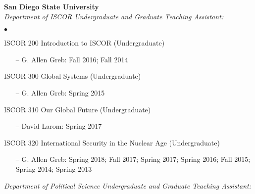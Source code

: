 \documentclass[letterpaper,12pt]{article}
\newenvironment{list2}{
  \begin{list}{$\bullet$}{%
      \setlength{\itemsep}{0in}
      \setlength{\parsep}{0in} 
      \setlength{\parskip}{0in}
      \setlength{\topsep}{0in} 
      \setlength{\partopsep}{0in}
      \setlength{\leftmargin}{1in}
      \setlength{\labelsep}{1em}
      \setlength{\labelwidth}{1em}
      \setlength{\itemindent}{-2em}
      \setlength{\listparindent}{2em}}}{\end{list}}
\begin{document}
\par
\textbf{San Diego State University}\\
\textit{Department of ISCOR Undergraduate and Graduate Teaching Assistant:}
\begin{list2}
    \item ISCOR 200 Introduction to ISCOR (Undergraduate)
        \begin{enumerate}[leftmargin=!,labelindent=0pt,itemindent=-15pt]
            \item[--] G. Allen Greb: Fall 2016; Fall 2014
        \end{enumerate}
    \item ISCOR 300 Global Systems (Undergraduate)
        \begin{enumerate}[leftmargin=!,labelindent=0pt,itemindent=-15pt]
            \item[--] G. Allen Greb: Spring 2015
        \end{enumerate}
    \item ISCOR 310 Our Global Future (Undergraduate)
        \begin{enumerate}[leftmargin=!,labelindent=0pt,itemindent=-15pt]
            \item[--] David Larom: Spring 2017
        \end{enumerate}
    \item ISCOR 320 International Security in the Nuclear Age (Undergraduate)
        \begin{enumerate}[leftmargin=!,labelindent=0pt,itemindent=-15pt]
            \item[--]  G. Allen Greb: Spring 2018; Fall 2017; Spring 2017; Spring 2016; Fall 2015; Spring 2014; Spring 2013
        \end{enumerate}
\end{list2}
\par
\textit{Department of Political Science Undergraduate and Graduate Teaching Assistant:}
\end{document}

